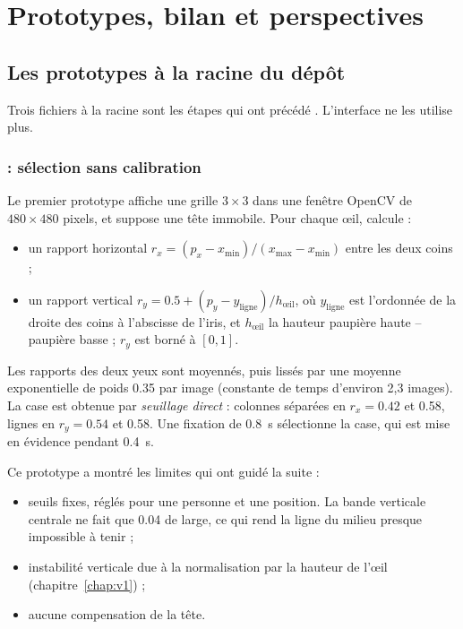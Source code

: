 \chapter{Prototypes, bilan et perspectives}
\label{chap:bilan}

\section{Les prototypes à la racine du dépôt}

Trois fichiers à la racine sont les étapes qui ont précédé . L'interface ne les utilise plus.

\subsection{\texorpdfstring{}{main.py} : sélection sans calibration}

Le premier prototype affiche une grille $3\times3$ dans une fenêtre OpenCV de $480\times480$ pixels, et suppose une tête immobile. Pour chaque œil,  calcule :
\begin{itemize}
  \item un rapport horizontal $r_x = (p_x - x_\text{min})/(x_\text{max} - x_\text{min})$ entre les deux coins ;
  \item un rapport vertical $r_y = 0.5 + (p_y - y_\text{ligne})/h_\text{œil}$, où $y_\text{ligne}$ est l'ordonnée de la droite des coins à l'abscisse de l'iris, et $h_\text{œil}$ la hauteur paupière haute -- paupière basse ; $r_y$ est borné à $[0, 1]$.
\end{itemize}
Les rapports des deux yeux sont moyennés, puis lissés par une moyenne exponentielle de poids \num{0.35} par image (constante de temps d'environ 2,3 images). La case est obtenue par \emph{seuillage direct} : colonnes séparées en $r_x = \num{0.42}$ et \num{0.58}, lignes en $r_y = \num{0.54}$ et \num{0.58}. Une fixation de \qty{0.8}{\second} sélectionne la case, qui est mise en évidence pendant \qty{0.4}{\second}.

Ce prototype a montré les limites qui ont guidé la suite :
\begin{itemize}
  \item seuils fixes, réglés pour une personne et une position. La bande verticale centrale ne fait que \num{0.04} de large, ce qui rend la ligne du milieu presque impossible à tenir ;
  \item instabilité verticale due à la normalisation par la hauteur de l'œil (chapitre~\ref{chap:v1}) ;
  \item aucune compensation de la tête.
\end{itemize}

